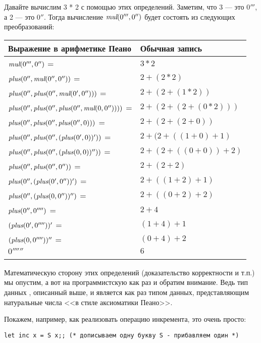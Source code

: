 \begin{example}
Давайте вычислим 3 * 2 с помощью этих определений. 
Заметим, что 3 --- это $0'''$, а 2 --- это $0''$. Тогда вычисление
$\textit{mul} (0''', 0'')$ будет состоять из следующих преобразований:

\begin{tabular}{ll}\\
\hline
Выражение в арифметике Пеано&Обычная запись\\
\hline
  $\textit{mul} (0''', 0'')$ = & $3 * 2$\\
  $\textit{plus} (0'', \textit{mul} (0'', 0''))$ = & $2 + (2*2)$\\
  $\textit{plus} (0'', \textit{plus} (0'', \textit{mul} (0', 0'')))$ = & $2 + (2 + (1*2))$\\
  $\textit{plus} (0'', \textit{plus} (0'', \textit{plus} (0'', \textit{mul} (0, 0''))))$ = & $2 + (2 + (2 + (0*2)))$\\
  $\textit{plus} (0'', \textit{plus} (0'', \textit{plus} (0'', 0)))$ = & $2 + (2 + (2 + 0))$\\
  $\textit{plus} (0'', \textit{plus} (0'', (\textit{plus} (0', 0))'))$ = & $2 + (2 + ((1 + 0) + 1)$\\
  $\textit{plus} (0'', \textit{plus} (0'', (\textit{plus} (0, 0))''))$ = & $2 + (2 + ((0 + 0)) + 2)$\\
  $\textit{plus} (0'', \textit{plus} (0'', 0''))$ = & $2 + (2 + 2)$\\
  $\textit{plus} (0'', (\textit{plus} (0', 0''))')$ = & $2 + ((1 + 2) + 1)$\\
  $\textit{plus} (0'', (\textit{plus} (0, 0''))'')$ = & $2 + ((0 + 2) + 2)$\\
  $\textit{plus} (0'', 0'''')$ = & $2 + 4$\\
  $(\textit{plus} (0', 0''''))'$ = & $(1 + 4) + 1$\\
  $(\textit{plus} (0, 0''''))''$ = & $(0 + 4) + 2$\\
  $0''''''$ & $6$\\
\hline\\
\end{tabular}
\end{example}

Математическую сторону этих определений (доказательство корректности и т.п.)
мы опустим, а вот на программистскую как раз и обратим внимание.
Ведь тип данных , описанный выше, и является как раз типом данных,
представляющим натуральные числа <<в стиле аксиоматики Пеано>>.

Покажем, например, как реализовать операцию инкремента, это очень просто:
\begin{verbatim}
let inc x = S x;; (* дописываем одну букву S - прибавляем один *)
\end{verbatim}

